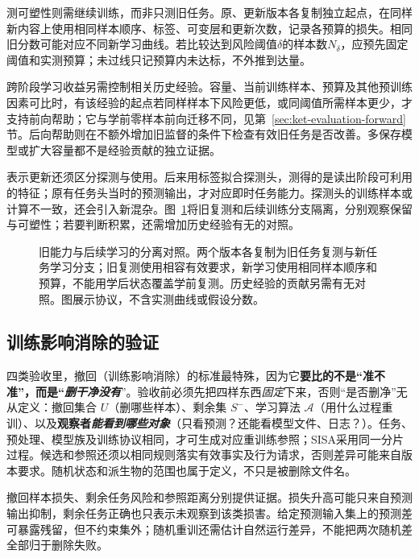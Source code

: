 测可塑性则需继续训练，而非只测旧任务。原、更新版本各复制独立起点，在同样新内容上使用相同样本顺序、标签、可变层和更新次数，记录各预算的损失。相同旧分数可能对应不同新学习曲线。若比较达到风险阈值$\delta$的样本数$N_\delta$，应预先固定阈值和实测预算；未过线只记预算内未达标，不外推到达量。

跨阶段学习收益另需控制相关历史经验。容量、当前训练样本、预算及其他预训练因素可比时，有该经验的起点若同样样本下风险更低，或同阈值所需样本更少，才支持前向帮助；它与学前零样本前向迁移不同，见第~\ref{sec:ket-evaluation-forward}节。后向帮助则在不额外增加旧监督的条件下检查有效旧任务是否改善。多保存模型或扩大容量都不是经验贡献的独立证据。

表示更新还须区分探测与使用。后来用标签拟合探测头，测得的是读出阶段可利用的特征；原有任务头当时的预测输出，才对应即时任务能力。探测头的训练样本或计算不一致，还会引入新混杂。图~\ref{fig:ket-update-evaluation}将旧复测和后续训练分支隔离，分别观察保留与可塑性；若要判断积累，还需增加历史经验有无的对照。

\begin{figure}[htbp]
\centering

\caption{旧能力与后续学习的分离对照。两个版本各复制为旧任务复测与新任务学习分支；旧复测使用相容有效要求，新学习使用相同样本顺序和预算，不能用学后状态覆盖学前复测。历史经验的贡献另需有无对照。图展示协议，不含实测曲线或假设分数。}
\label{fig:ket-update-evaluation}
\end{figure}

\FloatBarrier
\subsection{训练影响消除的验证}
\label{sec:ket-update-unlearning-validation}

四类验收里，撤回（训练影响消除）的标准最特殊，因为它\textbf{要比的不是“准不准”，而是“\emph{删干净没有}}”。验收前必须先把四样东西\emph{固定}下来，否则“是否删净”无从定义：撤回集合 $U$（删哪些样本）、剩余集 $S^-$、学习算法 $\mathcal A$（用什么过程重训）、以及\textbf{观察者\emph{能看到哪些对象}}（只看预测？还能看模型文件、日志？）。任务、预处理、模型族及训练协议相同，才可生成对应重训练参照；SISA采用同一分片过程。候选和参照还须以相同规则落实有效事实及行为请求，否则差异可能来自版本要求。随机状态和派生物的范围也属于定义，不只是被删除文件名。

撤回样本损失、剩余任务风险和参照距离分别提供证据。损失升高可能只来自预测输出抑制，剩余任务正确也只表示未观察到该类损害。给定预测输入集上的预测差可暴露残留，但不约束集外；随机重训还需估计自然运行差异，不能把两次随机差全部归于删除失败。

